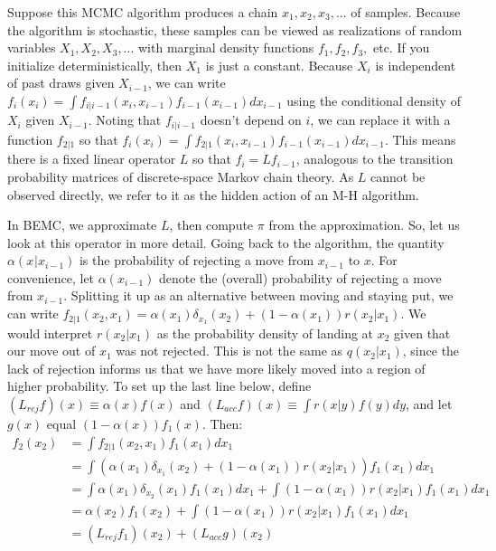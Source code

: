 \documentclass{article}
\begin{document}
Suppose this MCMC algorithm produces a chain $ x_1, x_2, x_3, ...$ of samples. Because the algorithm is stochastic, these samples can be viewed as realizations of random variables $X_1, X_2, X_3, ...$ with marginal density functions $f_1, f_2, f_3, $ etc. If you initialize deterministically, then $X_1$ is just a constant. Because $X_i$ is independent of past draws given $X_{i-1}$, we can write $f_i(x_i) = \int f_{i|i-1}(x_{i},x_{i-1})f_{i-1}(x_{i-1})dx_{i-1}$ using the conditional density of $X_i$ given $X_{i-1}$. Noting that $f_{i|i-1}$ doesn't depend on $i$, we can replace it with a function $f_{2|1}$ so that $f_i(x_i) = \int f_{2|1}(x_i, x_{i-1})f_{i-1}(x_{i-1})dx_{i-1}$. This means there is a fixed linear operator $L$ so that $f_{i} = Lf_{i-1}$, analogous to the transition probability matrices of discrete-space Markov chain theory. As $L$ cannot be observed directly, we refer to it as the hidden action of an M-H algorithm. 

In BEMC, we approximate $L$, then compute $\pi$ from the approximation. So, let us look at this operator in more detail. Going back to the algorithm, the quantity $\alpha(x_{}|x_{i-1})$ is the probability of rejecting a move from $x_{i-1}$ to $x$. For convenience, let $\alpha(x_{i-1})$ denote the (overall) probability of rejecting a move from $x_{i-1}$. Splitting it up as an alternative between moving and staying put, we can write $f_{2|1}(x_2, x_1) = \alpha(x_1)\delta_{x_1}(x_2) + (1-\alpha(x_1))r(x_2|x_1)$. We would interpret $r(x_2|x_1)$ as the probability density of landing at $x_2$ given that our move out of $x_1$ was not rejected. This is not the same as $q(x_2|x_1)$, since the lack of rejection informs us that we have more likely moved into a region of higher probability. To set up the last line below, define $(L_{rej}f)(x)\equiv \alpha(x)f(x)$ and $(L_{acc}f)(x)\equiv \int r(x|y)f(y)dy$, and let $g(x)$ equal $(1-\alpha(x))f_1(x)$. Then:
\begin{align*}
 f_2(x_2) &= \int f_{2|1}(x_2, x_1)f_1(x_1)dx_1 \\
&= \int (\alpha(x_1)\delta_{x_1}(x_2) + (1-\alpha(x_1))r(x_2|x_1))f_1(x_1)dx_1 \\
&= \int \alpha(x_1)\delta_{x_2}(x_1)f_1(x_1)dx_1 + \int (1-\alpha(x_1))r(x_2|x_1)f_1(x_1)dx_1 \\
&=  \alpha(x_2)f_1(x_2) + \int (1-\alpha(x_1))r(x_2|x_1)f_1(x_1)dx_1 \\
&=  (L_{rej}f_1)(x_2) + (L_{acc}g)(x_2) \\
\end{align*}
\end{document}
